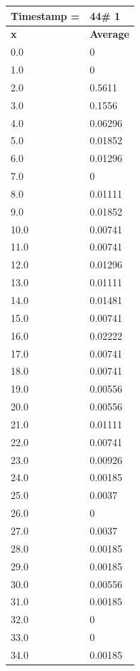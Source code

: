 \begin{tabular}{|l||l|}
\hline
\textbf{Timestamp =} & \textbf{44}\# 1\\\hline
	\textbf{x} & \textbf{Average} \\ \hline
\hline
	0.0 & 0 \\ \hline
	1.0 & 0 \\ \hline
	2.0 & 0.5611 \\ \hline
	3.0 & 0.1556 \\ \hline
	4.0 & 0.06296 \\ \hline
	5.0 & 0.01852 \\ \hline
	6.0 & 0.01296 \\ \hline
	7.0 & 0 \\ \hline
	8.0 & 0.01111 \\ \hline
	9.0 & 0.01852 \\ \hline
	10.0 & 0.00741 \\ \hline
	11.0 & 0.00741 \\ \hline
	12.0 & 0.01296 \\ \hline
	13.0 & 0.01111 \\ \hline
	14.0 & 0.01481 \\ \hline
	15.0 & 0.00741 \\ \hline
	16.0 & 0.02222 \\ \hline
	17.0 & 0.00741 \\ \hline
	18.0 & 0.00741 \\ \hline
	19.0 & 0.00556 \\ \hline
	20.0 & 0.00556 \\ \hline
	21.0 & 0.01111 \\ \hline
	22.0 & 0.00741 \\ \hline
	23.0 & 0.00926 \\ \hline
	24.0 & 0.00185 \\ \hline
	25.0 & 0.0037 \\ \hline
	26.0 & 0 \\ \hline
	27.0 & 0.0037 \\ \hline
	28.0 & 0.00185 \\ \hline
	29.0 & 0.00185 \\ \hline
	30.0 & 0.00556 \\ \hline
	31.0 & 0.00185 \\ \hline
	32.0 & 0 \\ \hline
	33.0 & 0 \\ \hline
	34.0 & 0.00185 \\ \hline
\end{tabular}
